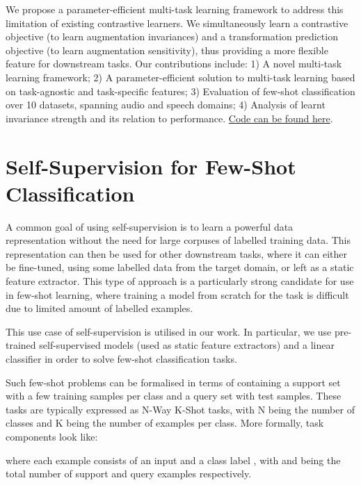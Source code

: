 \documentclass{INTERSPEECH2023}
\begin{document}
\noindent We propose a parameter-efficient multi-task learning framework to address this limitation of existing contrastive learners. We simultaneously learn a contrastive objective (to learn augmentation invariances) and a transformation prediction objective (to learn augmentation sensitivity), thus providing a more flexible feature for downstream tasks. 
Our contributions include: 1) A novel multi-task learning  framework; 2) A parameter-efficient solution to multi-task learning based on task-agnostic and task-specific features; 3) Evaluation of few-shot classification over 10 datasets, spanning audio and speech domains; 4) Analysis of learnt invariance strength and its relation to performance.  \href{https://github.com/CHeggan/MT-SLVR}{Code can be found here}.

\section{Self-Supervision for Few-Shot Classification}
A common goal of using self-supervision is to learn a powerful data representation without the need for large corpuses of labelled training data. This representation can then be used for other downstream tasks, where it can either be fine-tuned, using some labelled data from the target domain, or left as a static feature extractor. This type of approach is a particularly strong candidate for use in few-shot learning, where training a model from scratch for the task is difficult due to limited amount of labelled examples. 

\noindent This use case of self-supervision is utilised in our work. In particular, we use pre-trained self-supervised models (used as static feature extractors) and a linear classifier in order to solve few-shot classification tasks. 

\noindent Such few-shot problems can be formalised in terms of containing a support set  with a few training samples per class and a query set  with test samples. These tasks are typically expressed as N-Way K-Shot tasks, with N being the number of classes and K being the number of examples per class. More formally, task components look like:


where each example  consists of an input  and a class label , with  and  being the total number of support and query examples respectively.
\end{document}
